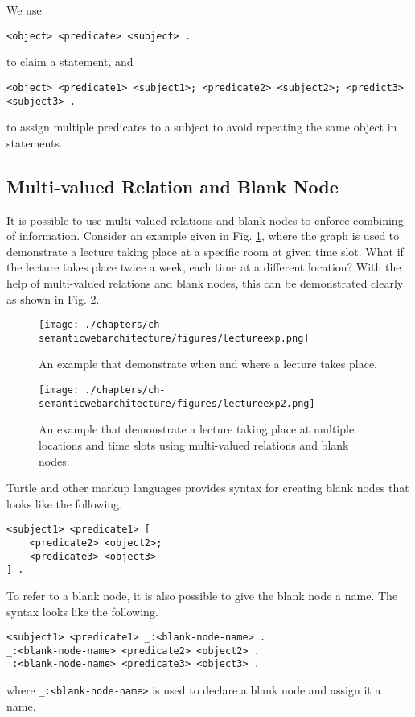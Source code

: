 We use
\begin{lstlisting}
<object> <predicate> <subject> .
\end{lstlisting}
to claim a statement, and
\begin{lstlisting}
<object> <predicate1> <subject1>; <predicate2> <subject2>; <predict3> <subject3> .
\end{lstlisting}
to assign multiple predicates to a subject to avoid repeating the same object in statements.

\subsection{Multi-valued Relation and Blank Node}

It is possible to use multi-valued relations and blank nodes to enforce combining of information. Consider an example given in Fig. \ref{fig:lectureexp}, where the graph is used to demonstrate a lecture taking place at a specific room at given time slot. What if the lecture takes place twice a week, each time at a different location? With the help of multi-valued relations and blank nodes, this can be demonstrated clearly as shown in Fig. \ref{fig:lectureexp2}.
\begin{figure}[htbp]
	\centering
	\texttt{[image: ./chapters/ch-semanticwebarchitecture/figures/lectureexp.png]}
	\caption{An example that demonstrate when and where a lecture takes place.}
	\label{fig:lectureexp}
\end{figure}

\begin{figure}[htbp]
	\centering
	\texttt{[image: ./chapters/ch-semanticwebarchitecture/figures/lectureexp2.png]}
	\caption{An example that demonstrate a lecture taking place at multiple locations and time slots using multi-valued relations and blank nodes.}
	\label{fig:lectureexp2}
\end{figure}

Turtle and other markup languages provides syntax for creating blank nodes that looks like the following.
\begin{lstlisting}
<subject1> <predicate1> [
	<predicate2> <object2>;
	<predicate3> <object3>
] .
\end{lstlisting}
To refer to a blank node, it is also possible to give the blank node a name. The syntax looks like the following.
\begin{lstlisting}
<subject1> <predicate1> _:<blank-node-name> .
_:<blank-node-name> <predicate2> <object2> .
_:<blank-node-name> <predicate3> <object3> .
\end{lstlisting}
where \verb|_:<blank-node-name>| is used to declare a blank node and assign it a name.

